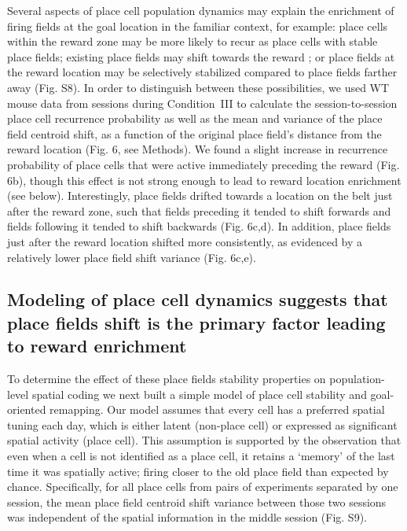 Several aspects of place cell population dynamics may explain the enrichment of firing fields at the goal location in the familiar context, for example: place cells within the reward zone may be more likely to recur as place cells with stable place fields; existing place fields may shift towards the reward \citep{Lee2006a}; or place fields at the reward location may be selectively stabilized compared to place fields farther away (Fig. S8).  In order to distinguish between these possibilities, we used WT mouse data from sessions during Condition~III to calculate the session-to-session place cell recurrence probability as well as the mean and variance of the place field centroid shift, as a function of the original place field's distance from the reward location (Fig. 6, see Methods).  We found a slight increase in recurrence probability of place cells that were active immediately preceding the reward (Fig. 6b), though this effect is not strong enough to lead to reward location enrichment (see below). Interestingly, place fields drifted towards a location on the belt just after the reward zone, such that fields preceding it tended to shift forwards and fields following it tended to shift backwards (Fig. 6c,d). In addition, place fields just after the reward location shifted more consistently, as evidenced by a relatively lower place field shift variance (Fig. 6c,e). 

\subsection{Modeling of place cell dynamics suggests that place fields shift is the primary factor leading to reward enrichment}

To determine the effect of these place fields stability properties on population-level spatial coding we next built a simple model of place cell stability and goal-oriented remapping. Our model assumes that every cell has a preferred spatial tuning each day, which is either latent (non-place cell) or expressed as significant spatial activity (place cell). This assumption is supported by the observation that even when a cell is not identified as a place cell, it retains a `memory' of the last time it was spatially active; firing closer to the old place field than expected by chance. Specifically, for all place cells from pairs of experiments separated by one session, the mean place field centroid shift variance between those two sessions was independent of the spatial information in the middle session (Fig. S9).

